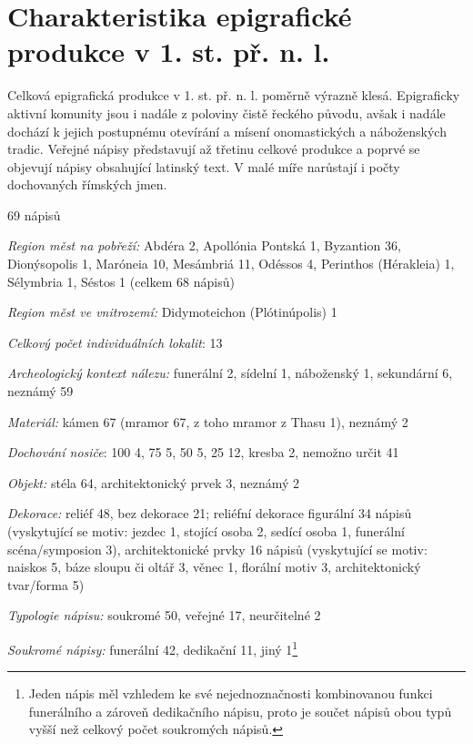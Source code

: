 \section[charakteristika-epigrafické-produkce-v-1.-st.-př.-n.-l.]{Charakteristika epigrafické produkce v 1. st. př. n. l.}

Celková epigrafická produkce v 1. st. př. n. l. poměrně výrazně klesá. Epigraficky aktivní komunity jsou i nadále z poloviny čistě řeckého původu, avšak i nadále dochází k jejich postupnému otevírání a mísení onomastických a náboženských tradic. Veřejné nápisy představují až třetinu celkové produkce a poprvé se objevují nápisy obsahující latinský text. V malé míře narůstají i počty dochovaných římských jmen.

\placetable[none]{}
\starttable[|l|]
\HL
{} 69 nápisů

{\em Region měst na pobřeží:} Abdéra 2, Apollónia Pontská 1, Byzantion 36, Dionýsopolis 1, Maróneia 10, Mesámbriá 11, Odéssos 4, Perinthos (Hérakleia) 1, Sélymbria 1, Séstos 1 (celkem 68 nápisů)

{\em Region měst ve vnitrozemí:} Didymoteichon (Plótinúpolis) 1

{\em Celkový počet individuálních lokalit}: 13

{\em Archeologický kontext nálezu:} funerální 2, sídelní 1, náboženský 1, sekundární 6, neznámý 59

{\em Materiál:} kámen 67 (mramor 67, z toho mramor z Thasu 1), neznámý 2

{\em Dochování nosiče}: 100  4, 75  5, 50  5, 25  12, kresba 2, nemožno určit 41

{\em Objekt:} stéla 64, architektonický prvek 3, neznámý 2

{\em Dekorace:} reliéf 48, bez dekorace 21; reliéfní dekorace figurální 34 nápisů (vyskytující se motiv: jezdec 1, stojící osoba 2, sedící osoba 1, funerální scéna/symposion 3), architektonické prvky 16 nápisů (vyskytující se motiv: naiskos 5, báze sloupu či oltář 3, věnec 1, florální motiv 3, architektonický tvar/forma 5)

{\em Typologie nápisu:} soukromé 50, veřejné 17, neurčitelné 2

{\em Soukromé nápisy:} funerální 42, dedikační 11, jiný 1\footnote{Jeden nápis měl vzhledem ke své nejednoznačnosti kombinovanou funkci funerálního a zároveň dedikačního nápisu, proto je součet nápisů obou typů vyšší než celkový počet soukromých nápisů.}

